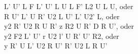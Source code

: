 L' U' L F L' U' L U L F' L2 U L U, oder\\
R U' L' U R' U2 L U' L' U2' L, oder\\
y2 R' U2 R U R' z R2 U R' D R U', oder\\
y2 F2 L' U' r U2 l' U R' U' R2, oder\\
y R' U L' U2 R U' R' U2 L R U'\\
